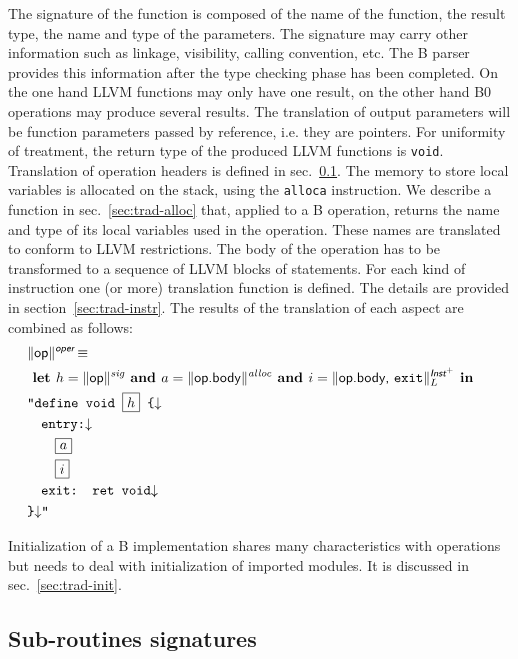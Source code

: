 \documentclass{llncs}
\newcommand{\trad}[2]{\ensuremath{\lVert \textsf{#1} \rVert^{\textit{#2}}}}
\newcommand{\nl}[0]{\ensuremath{\downarrow}}
\DeclareMathOperator{\isdef}{\equiv}
\newcommand{\llvm}[1]{\texttt{#1}}
\newcommand{\B}[1]{\textsf{#1}}
\newcommand{\ListOf}[1]{$\mbox{#1}^+$}
\newcommand{\LET}[0]{\textbf{ let }}
\newcommand{\IN}[0]{\textbf{ in }}
\newcommand{\AND}[0]{\textbf{ and }}
\newcommand{\PH}[1]{\framebox{$#1$}}
\begin{document}
\begin{enumerate}
The signature of the function is composed of the name of the function, the
result type, the name and type of the parameters. The signature may carry other
information such as linkage, visibility, calling convention, etc. The B parser
provides this information after the type checking phase has been completed.  On
the one hand LLVM functions may only have one result, on the other hand B0
operations may produce several results. The translation of output parameters
will be function parameters passed by reference, i.e. they are pointers. For
uniformity of treatment, the return type of the produced LLVM functions is
\llvm{void}. Translation of operation headers is defined in
sec.~\ref{sec:trad-header}. The memory to store local variables is allocated on
the stack, using the \llvm{alloca} instruction. We describe a function in
sec.~\ref{sec:trad-alloc} that, applied to a B operation, returns the name and
type of its local variables used in the operation. These names are translated to
conform to LLVM restrictions. The body of the operation has to be transformed to
a sequence of LLVM blocks of statements. For each kind of instruction one (or
more) translation function is defined. The details are provided in
section~\ref{sec:trad-instr}.  The results of the translation of each aspect are
combined as follows:
\begin{align*}
\begin{split}
  \lefteqn{\trad{\B{op}}{\B{oper}} \isdef} \\
  & \LET h = \trad{\B{op}}{sig} \AND   a = \trad{\B{op.body}}{alloc} \AND i = \trad{\B{op.body}, \llvm{exit}}{\ListOf{\B{Inst}}}_L \IN  \\
  & \llvm{"define void \PH{h} \{\nl} \\
  & \quad \llvm{entry:\nl} \\
  & \quad \quad \PH{a} \\
  & \quad \quad \PH{i} \\
  & \quad \llvm{exit: ret void\nl} \\
  & \llvm{\}\nl"}
\end{split}
\end{align*}

Initialization of a B implementation shares many characteristics with operations
but needs to deal with initialization of imported modules. It is discussed in
sec.~\ref{sec:trad-init}.

\subsection{Sub-routines signatures}
\label{sec:trad-header}


\end{enumerate}
\end{document}
